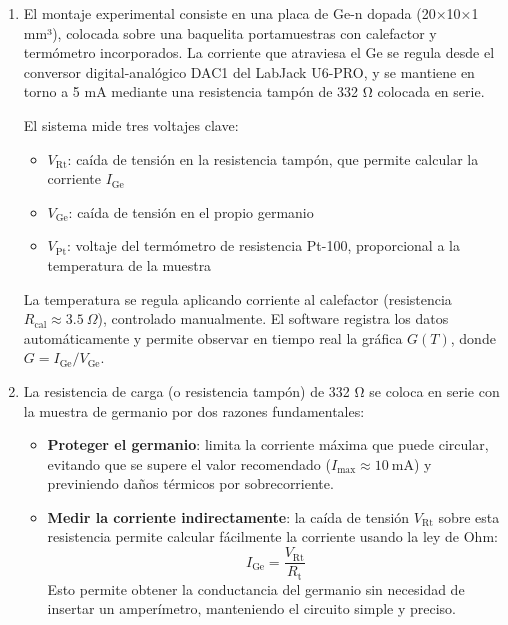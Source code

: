 \begin{enumerate}[label=\alph*)]

	\item El montaje experimental consiste en una placa de Ge-n dopada (20×10×1 mm³), colocada sobre una baquelita portamuestras con calefactor y termómetro incorporados. La corriente que atraviesa el Ge se regula desde el conversor digital-analógico DAC1 del LabJack U6-PRO, y se mantiene en torno a 5 mA mediante una resistencia tampón de 332 Ω colocada en serie.

	      El sistema mide tres voltajes clave:
	      \begin{itemize}
		      \item \( V_{\text{Rt}} \): caída de tensión en la resistencia tampón, que permite calcular la corriente \( I_{\text{Ge}} \)
		      \item \( V_{\text{Ge}} \): caída de tensión en el propio germanio
		      \item \( V_{\text{Pt}} \): voltaje del termómetro de resistencia Pt-100, proporcional a la temperatura de la muestra
	      \end{itemize}

	      La temperatura se regula aplicando corriente al calefactor (resistencia \( R_{\text{cal}} \approx 3.5\ \Omega \)), controlado manualmente. El software registra los datos automáticamente y permite observar en tiempo real la gráfica \( G(T) \), donde \( G = I_{\text{Ge}} / V_{\text{Ge}} \).

	\item La resistencia de carga (o resistencia tampón) de 332 Ω se coloca en serie con la muestra de germanio por dos razones fundamentales:

	      \begin{itemize}
		      \item \textbf{Proteger el germanio}: limita la corriente máxima que puede circular, evitando que se supere el valor recomendado (\( I_{\text{max}} \approx 10\ \text{mA} \)) y previniendo daños térmicos por sobrecorriente.
		      \item \textbf{Medir la corriente indirectamente}: la caída de tensión \( V_{\text{Rt}} \) sobre esta resistencia permite calcular fácilmente la corriente usando la ley de Ohm:
		            \[
			            I_{\text{Ge}} = \frac{V_{\text{Rt}}}{R_{\text{t}}}
		            \]
		            Esto permite obtener la conductancia del germanio sin necesidad de insertar un amperímetro, manteniendo el circuito simple y preciso.
	      \end{itemize}


\end{enumerate}
